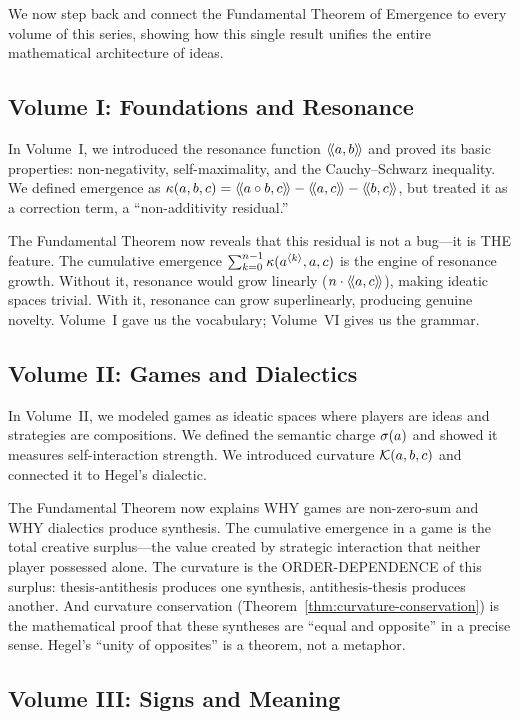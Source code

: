 We now step back and connect the Fundamental Theorem of Emergence to every volume
of this series, showing how this single result unifies the entire mathematical
architecture of ideas.

\subsection{Volume I: Foundations and Resonance}

In Volume~I, we introduced the resonance function $\langle\!\langle a, b \rangle\!\rangle$ and proved its
basic properties: non-negativity, self-maximality, and the Cauchy--Schwarz
inequality. We defined emergence as $\kappa(a,b,c) = \langle\!\langle a \circ b, c \rangle\!\rangle -
\langle\!\langle a, c \rangle\!\rangle - \langle\!\langle b, c \rangle\!\rangle$, but treated it as a correction term, a ``non-additivity
residual.''

The Fundamental Theorem now reveals that this residual is not a bug---it is
THE feature. The cumulative emergence $\sum_{k=0}^{n-1} \kappa(a^{\langle k \rangle}, a, c)$
is the engine of resonance growth. Without it, resonance would grow linearly
($n \cdot \langle\!\langle a, c \rangle\!\rangle$), making ideatic spaces trivial. With it, resonance can
grow superlinearly, producing genuine novelty. Volume~I gave us the vocabulary;
Volume~VI gives us the grammar.

\subsection{Volume II: Games and Dialectics}

In Volume~II, we modeled games as ideatic spaces where players are ideas and
strategies are compositions. We defined the semantic charge $\sigma(a)$ and
showed it measures self-interaction strength. We introduced curvature $\mathcal{K}(a,b,c)$
and connected it to Hegel's dialectic.

The Fundamental Theorem now explains WHY games are non-zero-sum and WHY dialectics
produce synthesis. The cumulative emergence in a game is the total creative
surplus---the value created by strategic interaction that neither player possessed
alone. The curvature is the ORDER-DEPENDENCE of this surplus: thesis-antithesis
produces one synthesis, antithesis-thesis produces another. And curvature conservation
(Theorem~\ref{thm:curvature-conservation}) is the mathematical proof that these
syntheses are ``equal and opposite'' in a precise sense. Hegel's ``unity of
opposites'' is a theorem, not a metaphor.

\subsection{Volume III: Signs and Meaning}

